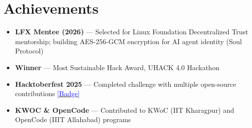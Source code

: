 \documentclass[a4paper,10pt]{article}
\newcommand{\resumeItem}[1]{\item\small{#1 \vspace{-2pt}}}
\newcommand{\resumeSubHeadingListStart}{\begin{itemize}[leftmargin=*]}
\newcommand{\resumeSubHeadingListEnd}{\end{itemize}}
\begin{document}
\section{Achievements}
\resumeSubHeadingListStart
\resumeItem{\textbf{LFX Mentee (2026)} — Selected for Linux Foundation Decentralized Trust mentorship; building AES-256-GCM encryption for AI agent identity (Soul Protocol)}
\resumeItem{\textbf{Winner} — Most Sustainable Hack Award, UHACK 4.0 Hackathon}
\resumeItem{\textbf{Hacktoberfest 2025} — Completed challenge with multiple open-source contributions \href{https://www.holopin.io/@sshekhar563}{\textcolor{blue}{[Badge]}}}
\resumeItem{\textbf{KWOC \& OpenCode} — Contributed to KWoC (IIT Kharagpur) and OpenCode (IIIT Allahabad) programs}
\resumeSubHeadingListEnd
\end{document}
